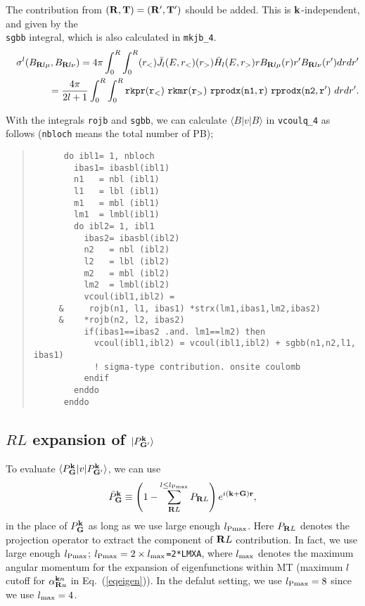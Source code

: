 \documentclass[a4paper,10pt,fleqn]{article}
\newcommand{\bfk}{{\bf k}}
\newcommand{\bfT}{{\bf T}}
\newcommand{\bfG}{{\bf G}}
\newcommand{\bfR}{{\bf R}}
\newcommand{\req}[1]{\mbox{Eq.~(\ref{#1})}}
\begin{document}
The contribution from $(\bfR,\bfT)=(\bfR',\bfT')$
should be added. This is $\bfk$-independent, and
given by the\\ \verb!sgbb! integral, which is also calculated in \verb!mkjb_4!.
\begin{eqnarray}
&&\sigma^l(B_{\bfR{l}\mu},B_{\bfR{l}\nu})=
{4\pi}
\int_0^{R}\int_0^{R} (r_<)\bar{J}_l(E,r_<) (r_>)\bar{H}_l(E,r_>)
r B_{\bfR{l}\mu}(r) r' B_{\bfR{l}\nu}(r') dr dr' \nonumber \\
&&=\frac{4\pi}{2l+1}
\int_0^{R}\int_0^{R} {\tt rkpr(r_<) \ rkmr(r_>) \ rprodx(n1,r) \ rprodx(n2, r')} 
\ dr dr'.
\end{eqnarray}

With the integrals \verb#rojb# and \verb#sgbb#, we can calculate
$\langle B|v|B \rangle$ in \verb!vcoulq_4! as follows
(\verb!nbloch! means the total number of PB);
\begin{quote}
{\baselineskip=3mm
\begin{verbatim}
      do ibl1= 1, nbloch
        ibas1= ibasbl(ibl1)
        n1   = nbl (ibl1)
        l1   = lbl (ibl1)
        m1   = mbl (ibl1)
        lm1  = lmbl(ibl1)
        do ibl2= 1, ibl1
          ibas2= ibasbl(ibl2)
          n2   = nbl (ibl2)
          l2   = lbl (ibl2)
          m2   = mbl (ibl2)
          lm2  = lmbl(ibl2)
          vcoul(ibl1,ibl2) =
     &     rojb(n1, l1, ibas1) *strx(lm1,ibas1,lm2,ibas2)
     &    *rojb(n2, l2, ibas2)
          if(ibas1==ibas2 .and. lm1==lm2) then
            vcoul(ibl1,ibl2) = vcoul(ibl1,ibl2) + sgbb(n1,n2,l1, ibas1)
            ! sigma-type contribution. onsite coulomb
          endif
        enddo
      enddo
\end{verbatim}}
\end{quote}

\subsection{$RL$ expansion of $|P^\bfk_{\bfG'} \rangle$}
To evaluate 
$\langle P^\bfk_\bfG |v| P^\bfk_{\bfG'} \rangle$, 
we can use 
\begin{eqnarray}
\bar{P}^{\bf k}_{{\bf G}} \equiv 
\left( 1- \sum_{\bfR{L}}^{l\le l_{\rm Pmax}} {P}_{\bfR{L}} \right) 
e^{i ({\bf k+ G}){\bf r}}, \label{eq:baripw}
\end{eqnarray}
in the place of ${P}^{\bf k}_{{\bf G}}$
as long as we use large enough $l_{\rm Pmax}$.
Here ${P}_{\bfR{L}}$ denotes the projection operator 
to extract the component of ${\bfR{L}}$ contribution.
In fact, we use large enough $l_{\rm Pmax}$;
$l_{\rm Pmax} = 2 \times l_{\rm max}$\verb!=2*LMXA!,
where $l_{\rm max}$ denotes the maximum angular momentum 
for the expansion of eigenfunctions within MT (maximum
$l$ cutoff for $\alpha^{{\bfk}n}_{\bfR u}$ in \req{eqeigen}). 
In the defalut setting, we use $l_{\rm Pmax}=8$ 
since we use $l_{\rm max}=4$. 
\end{document}
